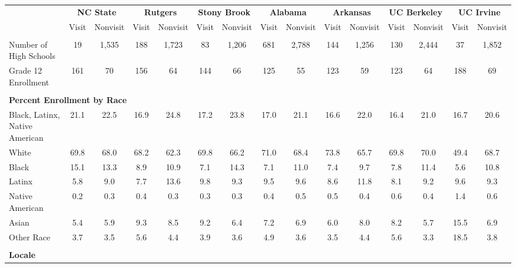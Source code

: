 \begin{tabular*}{\linewidth}{@{\extracolsep{\fill} } lcccccccccccccc}%
&\multicolumn{2}{c}{\bfseries NC State}&\multicolumn{2}{c}{\bfseries Rutgers}&\multicolumn{2}{c}{\bfseries Stony Brook}&\multicolumn{2}{c}{\bfseries Alabama}&\multicolumn{2}{c}{\bfseries Arkansas}&\multicolumn{2}{c}{\bfseries UC Berkeley}&\multicolumn{2}{c}{\bfseries UC Irvine}\\%
&Visit&\multicolumn{1}{l}{Nonvisit}&Visit&\multicolumn{1}{l}{Nonvisit}&Visit&\multicolumn{1}{l}{Nonvisit}&Visit&\multicolumn{1}{l}{Nonvisit}&Visit&\multicolumn{1}{l}{Nonvisit}&Visit&\multicolumn{1}{l}{Nonvisit}&Visit&\multicolumn{1}{l}{Nonvisit}\\%
\hline%
&&&&&&&&&&&&&&\\%
\hspace{0cm}Number of High Schools&19&1,535&188&1,723&83&1,206&681&2,788&144&1,256&130&2,444&37&1,852\\%
\hspace{0cm}Grade 12 Enrollment&161&70&156&64&144&66&125&55&123&59&123&64&188&69\\%
&&&&&&&&&&&&&&\\%
\multicolumn{15}{l}{\bfseries Percent Enrollment by Race}\\%
\hspace{0.2cm}Black, Latinx, Native American&21.1&22.5&16.9&24.8&17.2&23.8&17.0&21.1&16.6&22.0&16.4&21.0&16.7&20.6\\%
\hspace{0.2cm}White&69.8&68.0&68.2&62.3&69.8&66.2&71.0&68.4&73.8&65.7&69.8&70.0&49.4&68.7\\%
\hspace{0.2cm}Black&15.1&13.3&8.9&10.9&7.1&14.3&7.1&11.0&7.4&9.7&7.8&11.4&5.6&10.8\\%
\hspace{0.2cm}Latinx&5.8&9.0&7.7&13.6&9.8&9.3&9.5&9.6&8.6&11.8&8.1&9.2&9.6&9.3\\%
\hspace{0.2cm}Native American&0.2&0.3&0.4&0.3&0.3&0.3&0.4&0.5&0.5&0.4&0.6&0.4&1.4&0.6\\%
\hspace{0.2cm}Asian&5.4&5.9&9.3&8.5&9.2&6.4&7.2&6.9&6.0&8.0&8.2&5.7&15.5&6.9\\%
\hspace{0.2cm}Other Race&3.7&3.5&5.6&4.4&3.9&3.6&4.9&3.6&3.5&4.4&5.6&3.3&18.5&3.8\\%
&&&&&&&&&&&&&&\\%
\multicolumn{15}{l}{\bfseries Locale}\\%

\end{tabular*}
